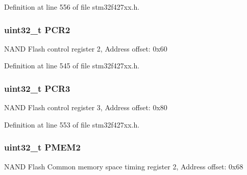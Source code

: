 Definition at line 556 of file stm32f427xx.\+h.

\subsubsection[{\texorpdfstring{P\+C\+R2}{PCR2}}]{ uint32\+\_\+t P\+C\+R2}\hypertarget{struct_f_m_c___bank2__3___type_def_ab0cb1d704ee64c62ad5be55522a2683a}{}\label{struct_f_m_c___bank2__3___type_def_ab0cb1d704ee64c62ad5be55522a2683a}
N\+A\+ND Flash control register 2, Address offset\+: 0x60 

Definition at line 545 of file stm32f427xx.\+h.

\subsubsection[{\texorpdfstring{P\+C\+R3}{PCR3}}]{ uint32\+\_\+t P\+C\+R3}\hypertarget{struct_f_m_c___bank2__3___type_def_a73861fa74b83973fa1b5f92735c042ef}{}\label{struct_f_m_c___bank2__3___type_def_a73861fa74b83973fa1b5f92735c042ef}
N\+A\+ND Flash control register 3, Address offset\+: 0x80 

Definition at line 553 of file stm32f427xx.\+h.

\subsubsection[{\texorpdfstring{P\+M\+E\+M2}{PMEM2}}]{ uint32\+\_\+t P\+M\+E\+M2}\hypertarget{struct_f_m_c___bank2__3___type_def_a2e5a7a96de68a6612affa6df8c309c3d}{}\label{struct_f_m_c___bank2__3___type_def_a2e5a7a96de68a6612affa6df8c309c3d}
N\+A\+ND Flash Common memory space timing register 2, Address offset\+: 0x68 

